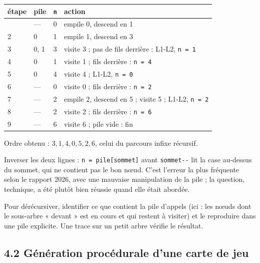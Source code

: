 \documentclass[11pt,a4paper]{article}
\begin{document}
\begin{longtable}[]{@{}llll@{}}
\toprule\noalign{}
étape & pile & \texttt{n} & action \\
\midrule\noalign{}
\endhead
\bottomrule\noalign{}
\endlastfoot
1 & --- & 0 & empile 0, descend en 1 \\
2 & 0 & 1 & empile 1, descend en 3 \\
3 & 0, 1 & 3 & visite 3 ; pas de fils derrière : L1-L2, \texttt{n\ =\ 1} \\
4 & 0 & 1 & visite 1 ; fils derrière : \texttt{n\ =\ 4} \\
5 & 0 & 4 & visite 4 ; L1-L2, \texttt{n\ =\ 0} \\
6 & --- & 0 & visite 0 ; fils derrière : \texttt{n\ =\ 2} \\
7 & --- & 2 & empile 2, descend en 5 ; visite 5 ; L1-L2, \texttt{n\ =\ 2} \\
8 & --- & 2 & visite 2 ; fils derrière : \texttt{n\ =\ 6} \\
9 & --- & 6 & visite 6 ; pile vide : fin \\
\end{longtable}

Ordre obtenu : \(3, 1, 4, 0, 5, 2, 6\), celui du parcours infixe récursif.

\begin{piege}

Inverser les deux lignes : \texttt{n\ =\ pile{[}sommet{]}} avant \texttt{sommet-\/-} lit la case au-dessus du sommet, qui ne contient pas le bon nœud. C'est l'erreur la plus fréquente selon le rapport 2026, avec une mauvaise manipulation de la pile ; la question, technique, a été plutôt bien réussie quand elle était abordée.

\end{piege}

\begin{methode}

Pour dérécursiver, identifier ce que contient la pile d'appels (ici : les nœuds dont le sous-arbre « devant » est en cours et qui restent à visiter) et le reproduire dans une pile explicite. Une trace sur un petit arbre vérifie le résultat.

\end{methode}

\hypertarget{guxe9nuxe9ration-procuxe9durale-dune-carte-de-jeu}{%
\subsection{4.2 Génération procédurale d'une carte de jeu}\label{guxe9nuxe9ration-procuxe9durale-dune-carte-de-jeu}}
\end{document}
